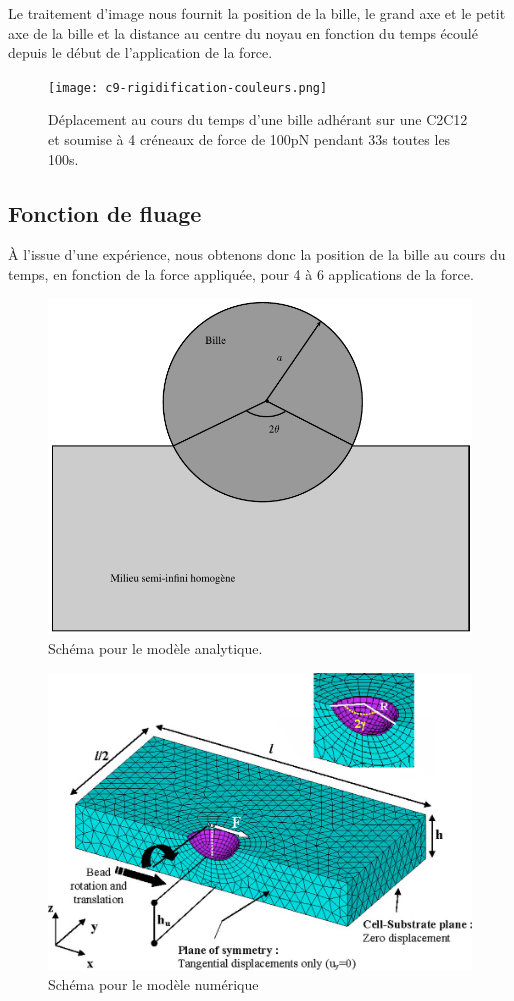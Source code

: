 	Le traitement d'image nous fournit la position de la bille, le grand axe et le petit axe de la bille et la distance au centre du noyau en fonction du temps écoulé depuis le début de l'application de la force. 
	
	
	\begin{figure}
	\texttt{[image: c9-rigidification-couleurs.png]}
	\caption{Déplacement au cours du temps d'une bille adhérant sur une C2C12 et soumise à 4 créneaux de force de 100pN pendant 33s toutes les 100s.}
	\end{figure}
	\subsection{Fonction de fluage \label{fluage}}
	\`A l'issue d'une expérience, nous obtenons donc la position de la bille au cours du temps, en fonction de la force appliquée, pour 4 à 6 applications de la force. 
	
	\begin{figure}
	\includegraphics[scale=0.4]{Figures/j_0.pdf} 
	\caption{Schéma pour le modèle analytique.}
	\end{figure}
	
	\begin{figure}
	\includegraphics[scale=0.3]{Figures/Kamgoue.png} 
	\caption{Schéma pour le modèle numérique \parencite{kamgoue_estimation_2007}}
	\end{figure}
	
